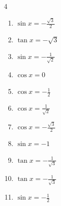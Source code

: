\begin{multicols}{4}
\begin{enumerate}
  \item $\displaystyle \sin{x}  = -\frac{\sqrt{3}}{2}$


  \item $\displaystyle \tan{x}  = -\sqrt{3}$


  \item $\displaystyle \sin{x}  = -\frac{1}{\sqrt{2}}$


  \item $\displaystyle \cos{x}  = 0$


  \item $\displaystyle \cos{x}  = -\frac{1}{2}$


  \item $\displaystyle \cos{x}  = \frac{1}{\sqrt{2}}$


  \item $\displaystyle \cos{x}  = -\frac{\sqrt{3}}{2}$


\columnbreak %

  \item $\displaystyle \sin{x}  = -1$


  \item $\displaystyle \tan{x}  = -\frac{1}{\sqrt{3}}$


  \item $\displaystyle \tan{x}  = -\frac{1}{\sqrt{3}}$


  \item $\displaystyle \sin{x}  = -\frac{1}{2}$



\end{enumerate}
\end{multicols}
